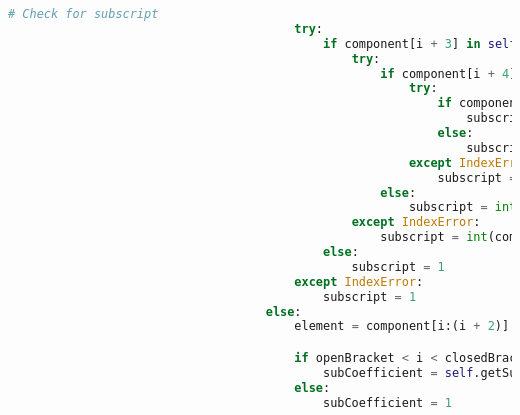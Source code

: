 \documentclass[a4paper,12pt]{article}
\begin{document}
\begin{lstlisting}[language=Python, caption=parseComponent method for finding elements, label={lst:parsecomponent}]
                                        # Check for subscript
                                        try:
                                            if component[i + 3] in self.integers:
                                                try:
                                                    if component[i + 4] in self.integers:
                                                        try:
                                                            if component[i + 5] in self.integers:
                                                                subscript = int(component[(i + 3): (i + 6)])
                                                            else:
                                                                subscript = int(component[(i + 3): (i + 5)])
                                                        except IndexError:
                                                            subscript = int(component[(i + 3): (i + 5)])
                                                    else:
                                                        subscript = int(component[i + 3])
                                                except IndexError:
                                                    subscript = int(component[i + 3])
                                            else:
                                                subscript = 1
                                        except IndexError:
                                            subscript = 1
                                    else:
                                        element = component[i:(i + 2)]

                                        if openBracket < i < closedBracket:
                                            subCoefficient = self.getSubCoefficient(component)
                                        else:
                                            subCoefficient = 1


\end{lstlisting}
\end{document}
